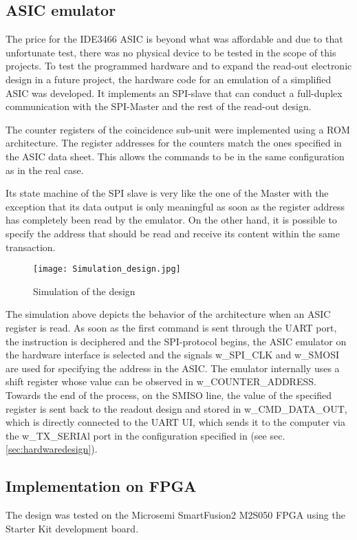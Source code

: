 \subsection{ASIC emulator}
The price for the IDE3466 ASIC is beyond what was affordable and due to that unfortunate test, there was no physical device to be tested in the scope of this projects. To test the programmed hardware and to expand the read-out electronic design in a future project, the hardware code for an emulation of a simplified ASIC was developed. It implements an SPI-slave that can conduct a full-duplex communication with the SPI-Master and the rest of the read-out design. 
\newline 

The counter registers of the coincidence sub-unit were implemented using a ROM architecture. The register addresses for the counters match the ones specified in the ASIC data sheet. This allows the commands to be in the same configuration as in the real case. 
\newline

Its state machine of the SPI slave is very like the one of the Master with the exception that its data output is only meaningful as soon as the register address has completely been read by the emulator. On the other hand, it is possible to specify the address that should be read and receive its content within the same transaction. 


\begin{figure}[H]
    \centering
    \texttt{[image: Simulation\_design.jpg]}
    \caption[]{Simulation of the design}
    \label{fig:Simulation}
\end{figure}

The simulation above depicts the behavior of the architecture when an ASIC register is read. As soon as the first command is sent through the UART port, the instruction is deciphered and the SPI-protocol begins, the ASIC emulator on the hardware interface is selected and the signals w\_SPI\_CLK and w\_SMOSI are used for specifying the address in the ASIC. The emulator internally uses a shift register whose value can be observed in w\_COUNTER\_ADDRESS. Towards the end of the process, on the SMISO line, the value of the specified register is sent back to the readout design and stored in w\_CMD\_DATA\_OUT, which is directly connected to the UART UI, which sends it to the computer via the w\_TX\_SERIAl port in the configuration specified in (see sec. \ref{sec:hardwaredesign}).

\subsection{Implementation on FPGA}
The design was tested on the Microsemi SmartFusion2 M2S050 FPGA using the Starter Kit development board.
\newline

